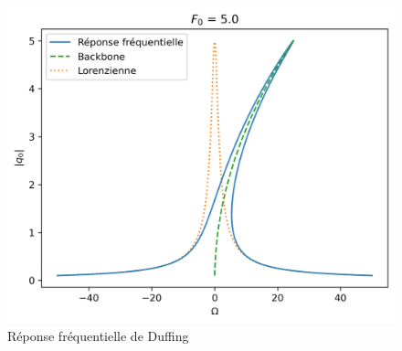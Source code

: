 \begin{figure}
\begin{subcaptionblock}{.31\linewidth}
    \end{subcaptionblock}
    \begin{subcaptionblock}{.31\linewidth}
      \includegraphics[width=\linewidth]{images/duffing/F0=5.0.png}
    \end{subcaptionblock}
    \caption{Réponse fréquentielle de Duffing}
\end{figure}

